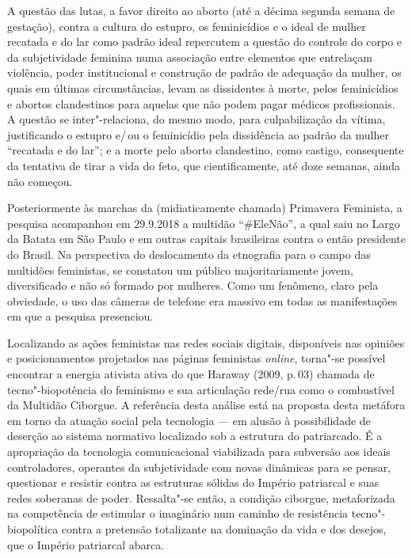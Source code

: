 A questão das lutas, a favor direito ao aborto (até a décima segunda
semana de gestação), contra a cultura do estupro, os feminicídios e o
ideal de mulher recatada e do lar como padrão ideal repercutem a questão
do controle do corpo e da subjetividade feminina numa associação entre
elementos que entrelaçam violência, poder institucional e construção de
padrão de adequação da mulher, os quais em últimas circunstâncias, levam
as dissidentes à morte, pelos feminicídios e abortos clandestinos para
aquelas que não podem pagar médicos profissionais. A questão se
inter"-relaciona, do mesmo modo, para culpabilização da vítima,
justificando o estupro e/\,ou o feminicídio pela dissidência ao padrão da
mulher ``recatada e do lar''; e a morte pelo aborto clandestino, como
castigo, consequente da tentativa de tirar a vida do feto, que
cientificamente, até doze semanas, ainda não começou.

Posteriormente às marchas da (midiaticamente chamada) Primavera
Feminista, a pesquisa acompanhou em 29.9.2018 a multidão ``\#EleNão'',
a qual saiu no Largo da Batata em São Paulo e em outras capitais
brasileiras contra o então presidente do Brasil. Na perspectiva do
deslocamento da etnografia para o campo das multidões feministas, se
constatou um público majoritariamente jovem, diversificado e não só
formado por mulheres. Como um fenômeno, claro pela obviedade, o uso das
câmeras de telefone era massivo em todas as manifestações em que a
pesquisa presenciou.

Localizando as ações feministas nas redes sociais digitais, disponíveis
nas opiniões e posicionamentos projetados nas páginas feministas
\emph{online}, torna"-se possível encontrar a energia ativista ativa do que
Haraway (2009, p.\,03) chamada de tecno"-biopotência do feminismo e sua
articulação rede/rua como o combustível da Multidão Ciborgue. A
referência desta análise está na proposta desta metáfora em torno da
atuação social pela tecnologia --- em alusão à possibilidade de deserção
ao sistema normativo localizado sob a estrutura do patriarcado. É a
apropriação da tecnologia comunicacional viabilizada para subversão aos
ideais controladores, operantes da subjetividade com novas dinâmicas
para se pensar, questionar e resistir contra as estruturas sólidas do
Império patriarcal e suas redes soberanas de poder. Ressalta"-se então, a
condição ciborgue, metaforizada na competência de estimular o imaginário
num caminho de resistência tecno"-biopolítica contra a pretensão
totalizante na dominação da vida e dos desejos, que o Império patriarcal
abarca.

